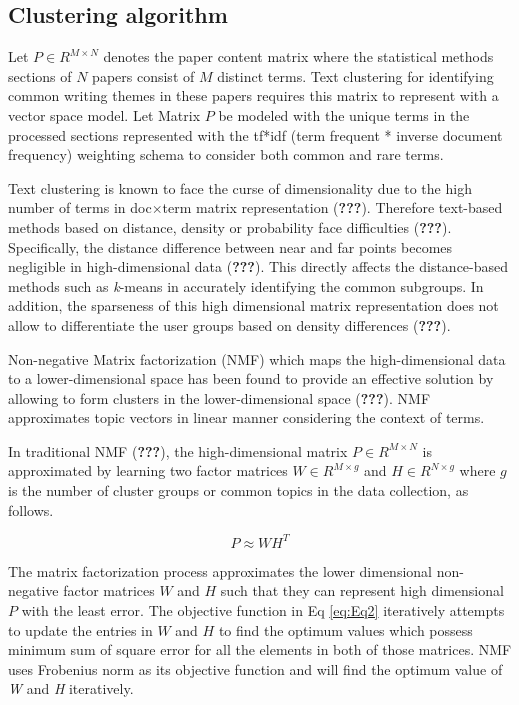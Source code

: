 \documentclass[
]{article}
\begin{document}
\subsection{Clustering algorithm}

Let \(P \in R^{M \times N}\) denotes the paper content matrix where the statistical methods sections of \(N\) papers consist of \(M\) distinct terms. Text clustering for identifying common writing themes in these papers requires this matrix to represent with a vector space model. Let Matrix \(P\) be modeled with the unique terms in the processed sections represented with the tf*idf (term frequent * inverse document frequency) weighting schema to consider both common and rare terms.

Text clustering is known to face the curse of dimensionality due to the high number of terms in doc\(\times\)term matrix representation ({\textbf{???}}). Therefore text-based methods based on distance, density or probability face difficulties ({\textbf{???}}). Specifically, the distance difference between near and far points becomes negligible in high-dimensional data ({\textbf{???}}). This directly affects the distance-based methods such as \textit{k}-means \cite{jain} in accurately identifying the common subgroups. In addition, the sparseness of this high dimensional matrix representation does not allow to differentiate the user groups based on density differences ({\textbf{???}}).

Non-negative Matrix factorization (NMF) which maps the high-dimensional data to a lower-dimensional space has been found to provide an effective solution by allowing to form clusters in the lower-dimensional space ({\textbf{???}}). NMF approximates topic vectors in linear manner considering the context of terms.

In traditional NMF ({\textbf{???}}), the high-dimensional matrix \(P \in R^{M \times N}\) is approximated by learning two factor matrices \(W \in R^{M \times g}\) and \(H \in R ^{N \times g}\) where \(g\) is the number of cluster groups or common topics in the data collection, as follows.

\begin{equation}
\label{eq:2}
 P \approx WH^{T} 
\end{equation}

The matrix factorization process approximates the lower dimensional non-negative factor matrices \(W\) and \(H\) such that they can represent high dimensional \(P\) with the least error. The objective function in Eq \ref{eq:Eq2} iteratively attempts to update the entries in \(W\) and \(H\) to find the optimum values which possess minimum sum of square error for all the elements in both of those matrices. NMF uses Frobenius norm as its objective function and will find the optimum value of \textit{W} and \textit{H} iteratively.
\end{document}

